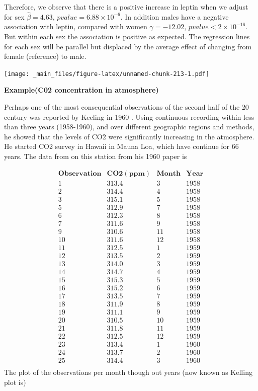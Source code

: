 \documentclass[
]{book}
\begin{document}
Therefore, we observe that there is a positive increase in leptin when we adjust for sex \(\hat{\beta}=4.63\), \(pvalue=6.88 \times 10^{-6}\). In addition males have a negative association with leptin, compared with women \(\gamma=-12.02\), \(pvalue<2 \times 10^{-16}\). But within each sex the association is positive as expected.
The regression lines for each sex will be parallel but displaced by the average effect of changing from female (reference) to male.

\texttt{[image: \_main\_files/figure-latex/unnamed-chunk-213-1.pdf]}

\textbf{Example(C02 concentration in atmosphere)}

Perhaps one of the most consequential observations of the second half of the 20 century was reported by Keeling in 1960 \citep{Keeling1960}. Using continuous recording within less than three years (1958-1960), and over different geographic regions and methods, he showed that the levels of CO2 were significantly increasing in the atmosphere. He started CO2 survey in Hawaii in Mauna Loa, which have continue for 66 years. The data from on this station from his 1960 paper is

\[
  \begin{array}{cccc}
  \mathbf{Observation} & \mathbf{CO2 (ppm)} & \mathbf{Month} & \mathbf{Year} \\ 
1  & 313.4 &  3  & 1958 \\ 
2  & 314.4 &  4  & 1958 \\ 
3  & 315.1 &  5  & 1958 \\ 
5  & 312.9 &  7  & 1958 \\ 
6  & 312.3 &  8  & 1958 \\ 
7  & 311.6 &  9  & 1958 \\ 
9  & 310.6 & 11  & 1958 \\ 
10 & 311.6 & 12  & 1958 \\ 
11 & 312.5 &  1  & 1959 \\ 
12 & 313.5 &  2  & 1959 \\ 
13 & 314.0 &  3  & 1959 \\ 
14 & 314.7 &  4  & 1959 \\ 
15 & 315.3 &  5  & 1959 \\ 
16 & 315.2 &  6  & 1959 \\ 
17 & 313.5 &  7  & 1959 \\ 
18 & 311.9 &  8  & 1959 \\ 
19 & 311.1 &  9  & 1959 \\ 
20 & 310.5 & 10  & 1959 \\ 
21 & 311.8 & 11  & 1959 \\ 
22 & 312.5 & 12  & 1959 \\ 
23 & 313.4 &  1  & 1960 \\ 
24 & 313.7 &  2  & 1960 \\ 
25 & 314.4 &  3  & 1960 \\ 
  \end{array}
\]
The plot of the observations per month though out years (now known as Kelling plot is)
\end{document}
